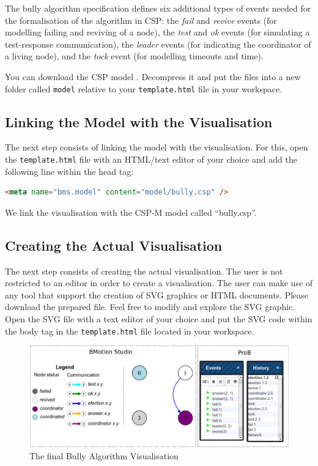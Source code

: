The bully algorithm specification defines six additional types of events needed for the formalisation of the algorithm in CSP:
the \textit{fail} and \textit{revive} events (for modelling failing and reviving of a node), the \textit{test} and \textit{ok} events (for simulating a test-response communication), the \textit{leader} events (for indicating the coordinator of a living node), and the \textit{tock} event (for modelling timeouts and time).

You can download the CSP model .
Decompress it and put the files into a new folder called \texttt{model} relative to your \texttt{template.html} file in your workspace.

\subsection{Linking the Model with the Visualisation}

The next step consists of linking the model with the visualisation.
For this, open the \texttt{template.html} file with an HTML/text editor of your choice and add the following line within the head tag:

\begin{lstlisting}[language=html]
<meta name="bms.model" content="model/bully.csp" />
\end{lstlisting}

We link the visualisation with the CSP-M model called ``bully.csp''.

\subsection{Creating the Actual Visualisation}
\label{tutorial_csp_create_vis}

The next step consists of creating the actual visualisation.
The user is not restricted to an editor in order to create a visualisation.
The user can make use of any tool that support the creation of SVG graphics or HTML documents.
Please download the prepared  file.
Feel free to modify and explore the SVG graphic.
Open the SVG file with a text editor of your choice and put the SVG code within the body tag in the \texttt{template.html} file located in your workspace.

\begin{figure}[h!]\centering
	\includegraphics[width=\textwidth]{img/tutorial/runningvis}
	\caption{The final Bully Algorithm Visualisation}
	\label{fig:BullyVisState}
\end{figure}

